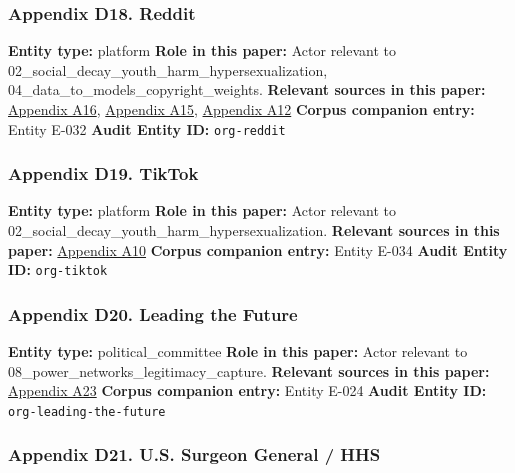 \documentclass[
  american,
  11pt,
  letterpaper,
]{article}
\begin{document}
\subsubsection{Appendix D18. Reddit}\label{ch-10-appendix-d18-reddit}

\textbf{Entity type:} platform \textbf{Role in this paper:} Actor
relevant to 02\_social\_decay\_youth\_harm\_hypersexualization,
04\_data\_to\_models\_copyright\_weights. \textbf{Relevant sources in
this paper:}
\hyperref[ch-10-appendix-a16-reddit-strikes-60m-deal-allowing-google-to-train-ai-models-on-its-posts-unveils-ipo-plans]{Appendix
A16},
\hyperref[ch-10-appendix-a15-language-models-are-unsupervised-multitask-learners]{Appendix
A15},
\hyperref[ch-10-appendix-a12-quantifying-social-organization-and-political-polarization-in-online-platforms]{Appendix
A12} \textbf{Corpus companion entry:} Entity E-032 \textbf{Audit Entity
ID:} \texttt{org-reddit}

\subsubsection{Appendix D19. TikTok}\label{ch-10-appendix-d19-tiktok}

\textbf{Entity type:} platform \textbf{Role in this paper:} Actor
relevant to 02\_social\_decay\_youth\_harm\_hypersexualization.
\textbf{Relevant sources in this paper:}
\hyperref[ch-10-appendix-a10-when-kids-mode-isn-t-for-kids-investigating-tiktok-s-under-13-experience]{Appendix
A10} \textbf{Corpus companion entry:} Entity E-034 \textbf{Audit Entity
ID:} \texttt{org-tiktok}

\subsubsection{Appendix D20. Leading the
Future}\label{ch-10-appendix-d20-leading-the-future}

\textbf{Entity type:} political\_committee \textbf{Role in this paper:}
Actor relevant to 08\_power\_networks\_legitimacy\_capture.
\textbf{Relevant sources in this paper:}
\hyperref[ch-10-appendix-a23-leading-the-future-committee-overview]{Appendix
A23} \textbf{Corpus companion entry:} Entity E-024 \textbf{Audit Entity
ID:} \texttt{org-leading-the-future}

\subsubsection{Appendix D21. U.S. Surgeon General /
HHS}\label{ch-10-appendix-d21-u-s-surgeon-general-hhs}
\end{document}
